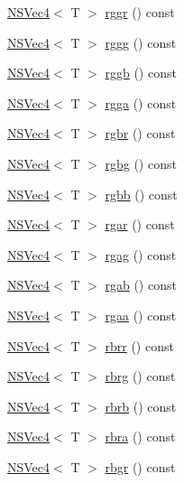 \begin{DoxyCompactItemize}
\item 
\hyperlink{structNSVec4}{N\-S\-Vec4}$<$ T $>$ \hyperlink{structNSVec4_a3d65cfddf5033eeb04ced234f384843f}{rggr} () const 
\item 
\hyperlink{structNSVec4}{N\-S\-Vec4}$<$ T $>$ \hyperlink{structNSVec4_aef142e260dd75fadc7bf4186c3b9160b}{rggg} () const 
\item 
\hyperlink{structNSVec4}{N\-S\-Vec4}$<$ T $>$ \hyperlink{structNSVec4_a6c26b976336a3d30d777e110dc1977a2}{rggb} () const 
\item 
\hyperlink{structNSVec4}{N\-S\-Vec4}$<$ T $>$ \hyperlink{structNSVec4_a71a55c9bee4dcbafe124d42228459faf}{rgga} () const 
\item 
\hyperlink{structNSVec4}{N\-S\-Vec4}$<$ T $>$ \hyperlink{structNSVec4_aae8b4d478522f16f8ca772303c29ce97}{rgbr} () const 
\item 
\hyperlink{structNSVec4}{N\-S\-Vec4}$<$ T $>$ \hyperlink{structNSVec4_a968af44515fa1f60fc6e793130b2589c}{rgbg} () const 
\item 
\hyperlink{structNSVec4}{N\-S\-Vec4}$<$ T $>$ \hyperlink{structNSVec4_a765299f5d9299ddfc50fccf2676397a8}{rgbb} () const 
\item 
\hyperlink{structNSVec4}{N\-S\-Vec4}$<$ T $>$ \hyperlink{structNSVec4_acb09972bb9a943ff5123832ef2c272ef}{rgar} () const 
\item 
\hyperlink{structNSVec4}{N\-S\-Vec4}$<$ T $>$ \hyperlink{structNSVec4_aefe9fda8b1fff464c013cf4565b2ad39}{rgag} () const 
\item 
\hyperlink{structNSVec4}{N\-S\-Vec4}$<$ T $>$ \hyperlink{structNSVec4_a89cf1d9f5e07802b11b06a54b761a416}{rgab} () const 
\item 
\hyperlink{structNSVec4}{N\-S\-Vec4}$<$ T $>$ \hyperlink{structNSVec4_ad078cfe42dc949285ce6b804e2f606d8}{rgaa} () const 
\item 
\hyperlink{structNSVec4}{N\-S\-Vec4}$<$ T $>$ \hyperlink{structNSVec4_a87a15e49ef11dcf3f9551cec4a9efedf}{rbrr} () const 
\item 
\hyperlink{structNSVec4}{N\-S\-Vec4}$<$ T $>$ \hyperlink{structNSVec4_aa32509d38e7cc53073f5432a676872e7}{rbrg} () const 
\item 
\hyperlink{structNSVec4}{N\-S\-Vec4}$<$ T $>$ \hyperlink{structNSVec4_afb4daa914cf2f1a18b61380ef07dcda0}{rbrb} () const 
\item 
\hyperlink{structNSVec4}{N\-S\-Vec4}$<$ T $>$ \hyperlink{structNSVec4_abae4225dfe2cc16e462d3481e739c820}{rbra} () const 
\item 
\hyperlink{structNSVec4}{N\-S\-Vec4}$<$ T $>$ \hyperlink{structNSVec4_af719c2ed26c9bbb43b6c1c4017c30451}{rbgr} () const 

\end{DoxyCompactItemize}
